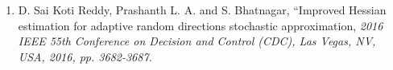\begin{enumerate}
\item D. Sai Koti Reddy, Prashanth L. A. and S. Bhatnagar, ``Improved Hessian estimation for adaptive random directions stochastic approximation, {\em 2016 IEEE 55th Conference on Decision and Control (CDC), Las Vegas, NV, USA, 2016, pp. 3682-3687.} \\ \\
\end{enumerate}
